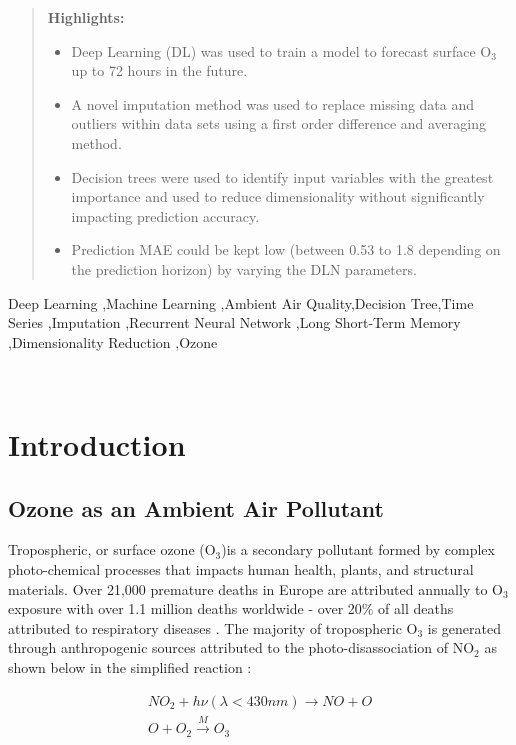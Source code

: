 \documentclass[preprint,12pt,a4paper,authoryear]{elsarticle}
\begin{document}
\begin{linenumbers}
\begin{frontmatter}
\begin{abstract}
\textbf{Highlights:}
\begin{itemize}
  \item Deep Learning (DL) was used to train a model to forecast surface O$_{3}$ up to 72 hours in the future.
  \item A novel imputation method was used to replace missing data and outliers within data sets using a first order difference and averaging method.
  \item Decision trees were used to identify input variables with the greatest importance and used to reduce dimensionality without significantly impacting prediction accuracy.
  \item Prediction MAE could be kept low (between 0.53 to 1.8 depending on the prediction horizon) by varying the DLN parameters.
\end{itemize}

\end{abstract}

\begin{keyword}
Deep Learning \sep Machine Learning \sep Ambient Air Quality\sep Decision Tree\sep Time Series \sep Imputation \sep Recurrent Neural Network \sep Long Short-Term Memory \sep Dimensionality Reduction \sep Ozone
\end{keyword}

\end{frontmatter}
 
\section{Introduction}

\subsection{Ozone as an Ambient Air Pollutant}
Tropospheric, or surface ozone (O$_{3}$)is a secondary pollutant formed by complex photo-chemical processes that impacts human health, plants, and structural materials. Over 21,000 premature deaths in Europe are attributed annually to O$_{3}$ exposure \citep{WHO2008} with over 1.1 million deaths worldwide - over 20\% of all deaths attributed to respiratory diseases \citep{Malley2017}. The majority of tropospheric O$_{3}$ is generated through anthropogenic sources \citep{Lelieveld2000, Cooper2006} attributed to the photo-disassociation of NO$_{2}$ as shown below in the simplified reaction \citep{Finlayson1993}:

\begin{equation}
\label{eq:ozoneformation}
\begin{gathered}
NO_{2}+h\nu (\lambda < 430nm) \rightarrow NO+O \\
O+O_{2}\overset{M}{\rightarrow} O_{3}
\end{gathered}
\end{equation}


\end{linenumbers}
\end{document}
